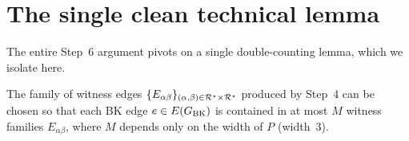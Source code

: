 \section{The single clean technical lemma}\label{sec:overlap-counting}

The entire Step~6 argument pivots on a single double-counting lemma,
which we isolate here.

\begin{lemma}\label{lem:overlap-counting}
The family of witness edges
$\{E_{\alpha\beta}\}_{(\alpha,\beta)\in\mathcal{R}^\star\times\mathcal{R}^\star}$
produced by Step~4 can be chosen so that each BK edge $e\in E(G_{\mathrm{BK}})$
is contained in at most $M$ witness families $E_{\alpha\beta}$, where
$M$ depends only on the width of $P$ (width~$3$).
\end{lemma}

